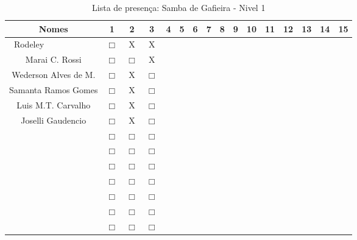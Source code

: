 \documentclass[a4paper,12pt]{article}
\begin{document}
\begin{landscape}
\begin{table}[!htbp]
\vspace*{-2cm}\centering
\caption{Lista de presença: Samba de Gafieira - Nivel 1}
\begin{tabular}{|*{16}{c|}}
\hline%
 Nomes & 1 & 2 & 3 & 4 & 5 & 6 & 7 & 8 & 9 & 10 & 11 & 12 & 13 & 14 & 15  \\ \hline
 \LARGE Rodeley$~~~~~~~~~~~~~~~~~~~~~~~~~~$&$\Box$ &X      &X      &  &  &  &  &  &  &  &  &  &  &  &  \\ \hline
 \LARGE Marai  C. Rossi                    &$\Box$ &$\Box$ &X      &  &  &  &  &  &  &  &  &  &  &  &  \\ \hline
 \LARGE Wederson Alves de M.               &$\Box$ &X      &$\Box$ &  &  &  &  &  &  &  &  &  &  &  &  \\ \hline
 \LARGE Samanta Ramos Gomes                &$\Box$ &X      &$\Box$ &  &  &  &  &  &  &  &  &  &  &  &  \\ \hline
 \LARGE Luis M.T. Carvalho                 &$\Box$ &X      &$\Box$ &  &  &  &  &  &  &  &  &  &  &  &  \\ \hline
 \LARGE Joselli Gaudencio                  &$\Box$ &X      &$\Box$ &  &  &  &  &  &  &  &  &  &  &  &  \\ \hline

 &$\Box$ &$\Box$ &$\Box$ &  &  &  &  &  &  &  &  &  &  &  &  \\ \hline
 &$\Box$ &$\Box$ &$\Box$ &  &  &  &  &  &  &  &  &  &  &  &  \\ \hline
 &$\Box$ &$\Box$ &$\Box$ &  &  &  &  &  &  &  &  &  &  &  &  \\ \hline
 &$\Box$ &$\Box$ &$\Box$ &  &  &  &  &  &  &  &  &  &  &  &  \\ \hline
 &$\Box$ &$\Box$ &$\Box$ &  &  &  &  &  &  &  &  &  &  &  &  \\ \hline
 &$\Box$ &$\Box$ &$\Box$ &  &  &  &  &  &  &  &  &  &  &  &  \\ \hline
 &$\Box$ &$\Box$ &$\Box$ &  &  &  &  &  &  &  &  &  &  &  &  \\ \hline
 \hline
\end{tabular}
\label{actividades2}
\end{table}

\end{landscape}
\end{document}
